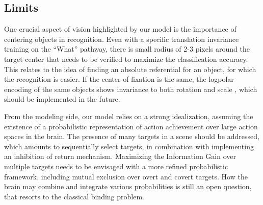 \subsection{Limits}



One crucial aspect of vision highlighted by our model is the importance of centering objects in recognition. Even with a specific translation invariance training on the ``What'' pathway, there is small radius of 2-3 pixels around the target center that needs to be verified to maximize the classification accuracy. This relates to the idea of finding an absolute referential for an object, for which the recognition is easier. If the center of fixation is the same, the logpolar encoding of the same objects shows invariance to both rotation and scale \cite{Traver10}, which should be implemented in the future.


From the modeling side, our model relies on a strong idealization, assuming the existence of a probabilistic representation of action achievement over large action spaces in the brain. 
The presence of many targets in a scene should be addressed, which amounts to sequentially select targets, in combination with implementing an inhibition of return mechanism. Maximizing the Information Gain over multiple targets needs to be envisaged with a more refined probabilistic framework, including mutual exclusion over overt and covert targets.
How the brain may combine and integrate various probabilities is still an open question, that resorts to the classical binding problem. %
